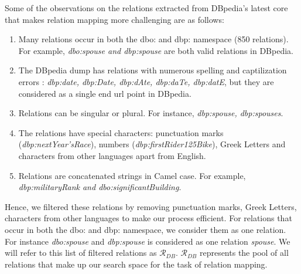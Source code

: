 \begin{sloppypar}
Some of the observations on the relations extracted from DBpedia's latest core that makes relation mapping more challenging are as follows:

\begin{enumerate}
\item Many relations occur in both the dbo: and dbp: namespace (850 relations). For example, \textit{dbo:spouse and dbp:spouse} are both valid relations in DBpedia. 

\item The DBpedia dump has relations with numerous spelling and captilization errors : \textit{dbp:date, dbp:Date, dbp:dAte, dbp:daTe, dbp:datE}, but they are considered as a single end url point in DBpedia.

\item Relations can be singular or plural. For instance, \textit{dbp:spouse, dbp:spouses}.

\item  The relations have special characters: punctuation marks (\textit{dbp:nextYear'sRace}), numbers (\textit{dbp:firstRider125Bike}), Greek Letters and characters from other languages apart from English.


\item Relations are concatenated strings in Camel case. For example, \textit{dbp:militaryRank and dbo:significantBuilding}.
\end{enumerate}

Hence, we filtered these relations by removing punctuation marks, Greek Letters, characters from other languages to make our process efficient. For relations that occur in both the dbo: and dbp: namespace, we consider them as one relation. For instance \textit{dbo:spouse} and \textit{dbp:spouse} is considered as one relation \textit{spouse}. We will refer to this list of filtered relations as $\mathcal{R}_{DB}$. $\mathcal{R}_{DB}$ represents the pool of all relations that make up our search space for the task of relation mapping.


\end{sloppypar}
